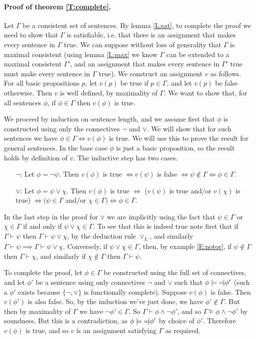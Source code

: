 \documentclass{article}
\theoremstyle{plain}
\newcommand{\lequiv}{\models\text{\reflectbox{$\models$}}}
\begin{document}
\paragraph{Proof of theorem \ref{T:complete}.}
Let $\Gamma$ be a consistent set of sentences. By lemma \ref{L:sat}, to complete the proof we need to show that $\Gamma$ is satisfiable, i.e. that there is an assignment that makes every sentence in $\Gamma$ true. We can suppose without loss of generality that $\Gamma$ is maximal consistent (using lemma \ref{L:max} we know $\Gamma$ can be extended to a maximal consistent $\Gamma'$, and an assignment that makes every sentence in $\Gamma'$ true must make every sentence in $\Gamma$ true).  We construct an assignment $v$ as follows. For all basic propositions $p$, let $v(p)$ be true if $p\in\Gamma$, and let $v(p)$ be false otherwise. Then $v$ is well defined, by maximality of $\Gamma$. We want to show that, for all sentences $\phi$, if $\phi\in \Gamma$ then $v(\phi)$ is true. 

We proceed by induction on sentence length, and we assume first that $\phi$ is constructed using only the connectives $\neg$ and $\vee$. We will show that for such sentences we have $\phi\in\Gamma\iff v(\phi)$ is true. We will use this to prove the result for general sentences. In the base case $\phi$ is just a basic proposition, so the result holds by definition of $v$. The inductive step has two cases.

\begin{enumerate}
\item[$\neg$:] Let $\phi=\neg\psi$. Then $v(\phi)$ is true $\iff v(\psi)$ is false $\iff \psi\not\in \Gamma\iff\phi\in\Gamma$.
\item[$\vee$:] Let $\phi=\psi\vee\chi$. Then $v(\phi)$ is true $\iff$ ($v(\psi)$ is true and/or $v(\chi)$ is true) $\iff (\psi\in\Gamma$ and/or $\chi\in\Gamma)\iff \phi\in\Gamma$. 
\end{enumerate} 
In the last step in the proof for $\vee$ we are implicitly using the fact that $\psi\in \Gamma$ or $\chi\in \Gamma$ if and only if $\psi\vee \chi\in\Gamma$. To see that this is indeed true note first that if $\Gamma\vdash \psi$ then $\Gamma\vdash \psi\vee \chi$, by the deduction rule $\vee_{I_l}$, and similarly $\Gamma\vdash \psi\implies\Gamma\vdash \psi\vee \chi$. Conversely, if $\psi\vee \chi\in \Gamma$, then, by example \ref{E:notor}, if $\psi\not\in\Gamma$ then $\Gamma\vdash\chi$, and similarly if $\chi\notin\Gamma$ then $\Gamma\vdash\psi$. 

To complete the proof, let $\phi\in \Gamma$ be constructed using the full set of connectives, and let $\phi'$ be a sentence using only connectives $\neg$ and $\vee$ such that $\phi\lequiv \phi'$ (such a $\phi'$ exists because $\{\neg,\vee\}$ is functionally complete). Suppose $v(\phi)$ is false. Then $v(\phi')$ is also false. So, by the induction we've just done, we have $\phi'\not\in\Gamma$. But then by maximality of $\Gamma$ we have $\neg\phi'\in\Gamma$. So $\Gamma\vdash \phi\wedge\neg\phi'$, and so $\Gamma\models \phi\wedge\neg\phi'$ by soundness. But this is a contradiction, as $\phi\lequiv\phi'$ by choice of $\phi'$. Therefore $v(\phi)$ is true, and so $v$ is an assignment satisfying $\Gamma$ as required.
\end{document}
